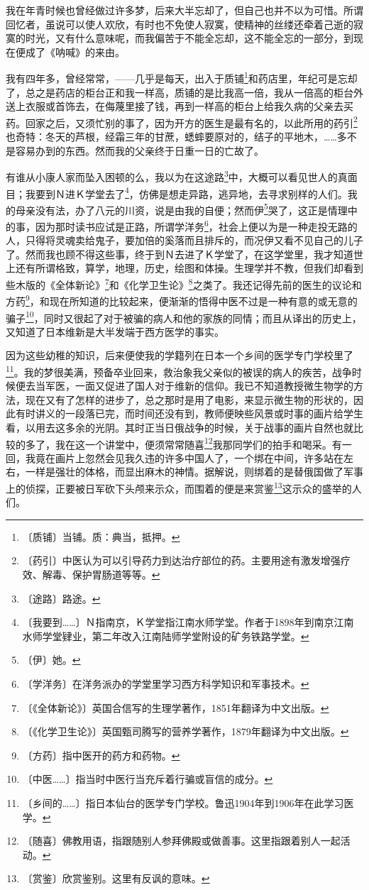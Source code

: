 \documentclass[12pt,UTF-8,openany]{ctexbook}
\begin{document}
\begin{normalsize}
    
    我在年青时候也曾经做过许多梦，后来大半忘却了，但自己也并不以为可惜。所谓回忆者，虽说可以使人欢欣，有时也不免使人寂寞，使精神的丝缕还牵着己逝的寂寞的时光，又有什么意味呢，而我偏苦于不能全忘却，这不能全忘的一部分，到现在便成了《呐喊》的来由。
    
    我有四年多，曾经常常，——几乎是每天，出入于质铺\footnote{〔质铺〕当铺。质：典当，抵押。}和药店里，年纪可是忘却了，总之是药店的柜台正和我一样高，质铺的是比我高一倍，我从一倍高的柜台外送上衣服或首饰去，在侮蔑里接了钱，再到一样高的柜台上给我久病的父亲去买药。回家之后，又须忙别的事了，因为开方的医生是最有名的，以此所用的药引\footnote{〔药引〕中医认为可以引导药力到达治疗部位的药。主要用途有激发增强疗效、解毒、保护胃肠道等等。}也奇特：冬天的芦根，经霜三年的甘蔗，蟋蟀要原对的，结子的平地木，……多不是容易办到的东西。然而我的父亲终于日重一日的亡故了。
    
    有谁从小康人家而坠入困顿的么，我以为在这途路\footnote{〔途路〕路途。}中，大概可以看见世人的真面目；我要到Ｎ进Ｋ学堂去了\footnote{〔我要到……〕Ｎ指南京，Ｋ学堂指江南水师学堂。作者于1898年到南京江南水师学堂肄业，第二年改入江南陆师学堂附设的矿务铁路学堂。}，仿佛是想走异路，逃异地，去寻求别样的人们。我的母亲没有法，办了八元的川资，说是由我的自便；然而伊\footnote{〔伊〕她。}哭了，这正是情理中的事，因为那时读书应试是正路，所谓学洋务\footnote{〔学洋务〕在洋务派办的学堂里学习西方科学知识和军事技术。}，社会上便以为是一种走投无路的人，只得将灵魂卖给鬼子，要加倍的奚落而且排斥的，而况伊又看不见自己的儿子了。然而我也顾不得这些事，终于到Ｎ去进了Ｋ学堂了，在这学堂里，我才知道世上还有所谓格致，算学，地理，历史，绘图和体操。生理学并不教，但我们却看到些木版的《全体新论》\footnote{〔《全体新论》〕英国合信写的生理学著作，1851年翻译为中文出版。}和《化学卫生论》\footnote{〔《化学卫生论》〕英国甄司腾写的营养学著作，1879年翻译为中文出版。}之类了。我还记得先前的医生的议论和方药\footnote{〔方药〕指中医开的药方和药物。}，和现在所知道的比较起来，便渐渐的悟得中医不过是一种有意的或无意的骗子\footnote{〔中医……〕指当时中医行当充斥着行骗或盲信的成分。}，同时又很起了对于被骗的病人和他的家族的同情；而且从译出的历史上，又知道了日本维新是大半发端于西方医学的事实。
    
    因为这些幼稚的知识，后来便使我的学籍列在日本一个乡间的医学专门学校里了\footnote{〔乡间的……〕指日本仙台的医学专门学校。鲁迅1904年到1906年在此学习医学。}。我的梦很美满，预备卒业回来，救治象我父亲似的被误的病人的疾苦，战争时候便去当军医，一面又促进了国人对于维新的信仰。我已不知道教授微生物学的方法，现在又有了怎样的进步了，总之那时是用了电影，来显示微生物的形状的，因此有时讲义的一段落已完，而时间还没有到，教师便映些风景或时事的画片给学生看，以用去这多余的光阴。其时正当日俄战争的时候，关于战事的画片自然也就比较的多了，我在这一个讲堂中，便须常常随喜\footnote{〔随喜〕佛教用语，指跟随别人参拜佛殿或做善事。这里指跟着别人一起活动。}我那同学们的拍手和喝采。有一回，我竟在画片上忽然会见我久违的许多中国人了，一个绑在中间，许多站在左右，一样是强壮的体格，而显出麻木的神情。据解说，则绑着的是替俄国做了军事上的侦探，正要被日军砍下头颅来示众，而围着的便是来赏鉴\footnote{〔赏鉴〕欣赏鉴别。这里有反讽的意味。}这示众的盛举的人们。
    

\end{normalsize}
\end{document}
